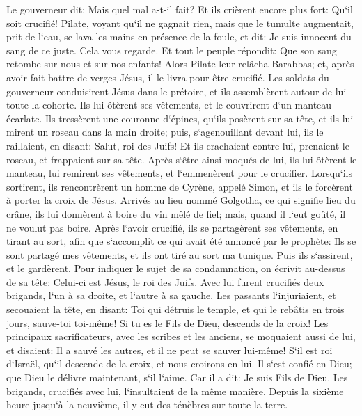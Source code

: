 \verse Le gouverneur dit: Mais quel mal a-t-il fait? Et ils crièrent encore plus fort: Qu`il soit crucifié! 
\verse Pilate, voyant qu`il ne gagnait rien, mais que le tumulte augmentait, prit de l`eau, se lava les mains en présence de la foule, et dit: Je suis innocent du sang de ce juste. Cela vous regarde. 
\verse Et tout le peuple répondit: Que son sang retombe sur nous et sur nos enfants! 
\verse Alors Pilate leur relâcha Barabbas; et, après avoir fait battre de verges Jésus, il le livra pour être crucifié. 
\verse Les soldats du gouverneur conduisirent Jésus dans le prétoire, et ils assemblèrent autour de lui toute la cohorte. 
\verse Ils lui ôtèrent ses vêtements, et le couvrirent d`un manteau écarlate. 
\verse Ils tressèrent une couronne d`épines, qu`ils posèrent sur sa tête, et ils lui mirent un roseau dans la main droite; puis, s`agenouillant devant lui, ils le raillaient, en disant: Salut, roi des Juifs! 
\verse Et ils crachaient contre lui, prenaient le roseau, et frappaient sur sa tête. 
\verse Après s`être ainsi moqués de lui, ils lui ôtèrent le manteau, lui remirent ses vêtements, et l`emmenèrent pour le crucifier. 
\verse Lorsqu`ils sortirent, ils rencontrèrent un homme de Cyrène, appelé Simon, et ils le forcèrent à porter la croix de Jésus. 
\verse Arrivés au lieu nommé Golgotha, ce qui signifie lieu du crâne, 
\verse ils lui donnèrent à boire du vin mêlé de fiel; mais, quand il l`eut goûté, il ne voulut pas boire. 
\verse Après l`avoir crucifié, ils se partagèrent ses vêtements, en tirant au sort, afin que s`accomplît ce qui avait été annoncé par le prophète: Ils se sont partagé mes vêtements, et ils ont tiré au sort ma tunique. 
\verse Puis ils s`assirent, et le gardèrent. 
\verse Pour indiquer le sujet de sa condamnation, on écrivit au-dessus de sa tête: Celui-ci est Jésus, le roi des Juifs. 
\verse Avec lui furent crucifiés deux brigands, l`un à sa droite, et l`autre à sa gauche. 
\verse Les passants l`injuriaient, et secouaient la tête, 
\verse en disant: Toi qui détruis le temple, et qui le rebâtis en trois jours, sauve-toi toi-même! Si tu es le Fils de Dieu, descends de la croix! 
\verse Les principaux sacrificateurs, avec les scribes et les anciens, se moquaient aussi de lui, et disaient: 
\verse Il a sauvé les autres, et il ne peut se sauver lui-même! S`il est roi d`Israël, qu`il descende de la croix, et nous croirons en lui. 
\verse Il s`est confié en Dieu; que Dieu le délivre maintenant, s`il l`aime. Car il a dit: Je suis Fils de Dieu. 
\verse Les brigands, crucifiés avec lui, l`insultaient de la même manière. 
\verse Depuis la sixième heure jusqu`à la neuvième, il y eut des ténèbres sur toute la terre. 
